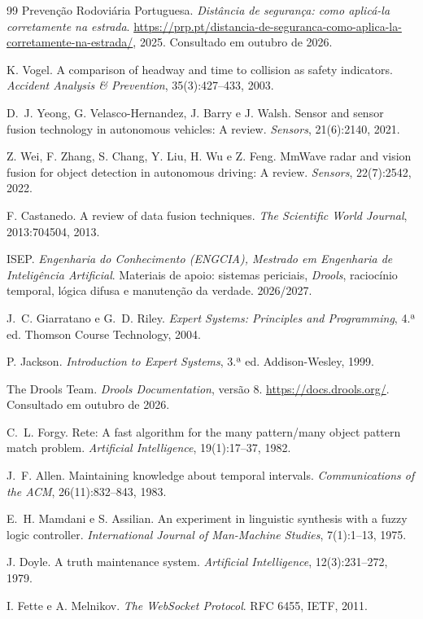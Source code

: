 \begin{thebibliography}{99}
 Prevenção Rodoviária Portuguesa. \emph{Distância de segurança: como aplicá-la
corretamente na estrada}.
\url{https://prp.pt/distancia-de-seguranca-como-aplica-la-corretamente-na-estrada/}, 2025.
Consultado em outubro de 2026.

 K. Vogel. A comparison of headway and time to collision as safety indicators.
\emph{Accident Analysis \& Prevention}, 35(3):427--433, 2003.

 D.~J. Yeong, G. Velasco-Hernandez, J. Barry e J. Walsh. Sensor and sensor fusion
technology in autonomous vehicles: A review. \emph{Sensors}, 21(6):2140, 2021.

 Z. Wei, F. Zhang, S. Chang, Y. Liu, H. Wu e Z. Feng. MmWave radar and vision
fusion for object detection in autonomous driving: A review. \emph{Sensors}, 22(7):2542, 2022.

 F. Castanedo. A review of data fusion techniques. \emph{The Scientific World
Journal}, 2013:704504, 2013.

 ISEP. \emph{Engenharia do Conhecimento (ENGCIA), Mestrado em Engenharia de
Inteligência Artificial}. Materiais de apoio: sistemas periciais, \emph{Drools}, raciocínio
temporal, lógica difusa e manutenção da verdade. 2026/2027.

 J.~C. Giarratano e G.~D. Riley. \emph{Expert Systems: Principles and
Programming}, 4.ª ed. Thomson Course Technology, 2004.

 P. Jackson. \emph{Introduction to Expert Systems}, 3.ª ed. Addison-Wesley,
1999.

 The Drools Team. \emph{Drools Documentation}, versão 8.
\url{https://docs.drools.org/}. Consultado em outubro de 2026.

 C.~L. Forgy. Rete: A fast algorithm for the many pattern/many object pattern
match problem. \emph{Artificial Intelligence}, 19(1):17--37, 1982.

 J.~F. Allen. Maintaining knowledge about temporal intervals.
\emph{Communications of the ACM}, 26(11):832--843, 1983.

 E.~H. Mamdani e S. Assilian. An experiment in linguistic synthesis with a
fuzzy logic controller. \emph{International Journal of Man-Machine Studies}, 7(1):1--13, 1975.

 J. Doyle. A truth maintenance system. \emph{Artificial Intelligence},
12(3):231--272, 1979.

 I. Fette e A. Melnikov. \emph{The WebSocket Protocol}. RFC 6455, IETF, 2011.

\end{thebibliography}

